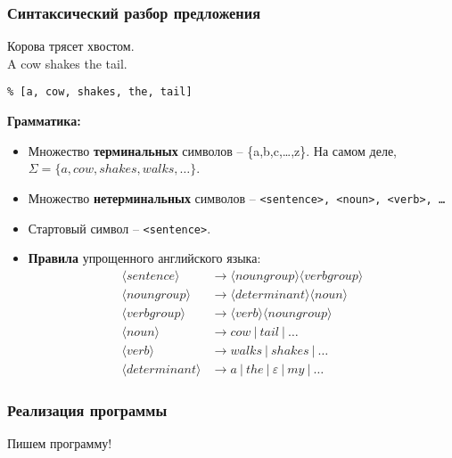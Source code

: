 \documentclass[10pt]{beamer}
\begin{document}
\begin{frame}[fragile]
  \frametitle{Синтаксический разбор предложения}
  Корова трясет хвостом.\\
  A cow shakes the tail.

  \verb|% [a, cow, shakes, the, tail]|

  \textbf{Грамматика:}
  \begin{itemize}
  \item Множество \textbf{терминальных} символов -- \{a,b,c,\ldots,z\}.  На самом деле, $\Sigma=\{a,cow,shakes,walks,\ldots\}$.
  \item Множество \textbf{нетерминальных} символов -- \texttt{<sentence>, <noun>, <verb>, \ldots}
  \item \textnormal{Стартовый} символ -- \texttt{<sentence>}.
  \item \textbf{Правила} упрощенного английского языка:
    \begin{align}
      \label{eq:eng-gramm}
      \langle{}sentence\rangle{} & \to  \langle{}noun group\rangle{} \langle{}verb group\rangle{} \\
      \langle{}noun group\rangle{} & \to  \langle{}determinant\rangle{} \langle{}noun\rangle{} \\
      \langle{}verb group\rangle{} & \to  \langle{}verb\rangle{} \langle{}noun group\rangle{} \\
      \langle{}noun\rangle{} & \to cow\ |\ tail\ |\ \ldots \\
      \langle{}verb\rangle{} & \to walks\ |\ shakes\ |\ \ldots \\
      \langle{}determinant\rangle{} & \to a\ |\ the\ |\ \varepsilon\ |\ my\ |\ \ldots
    \end{align}
  \end{itemize}
\end{frame}

\begin{frame}
  \frametitle{Реализация программы}
  \vfil
  \begin{center}
    \Large Пишем программу!
  \end{center}
  \vfil
\end{frame}


\end{document}
